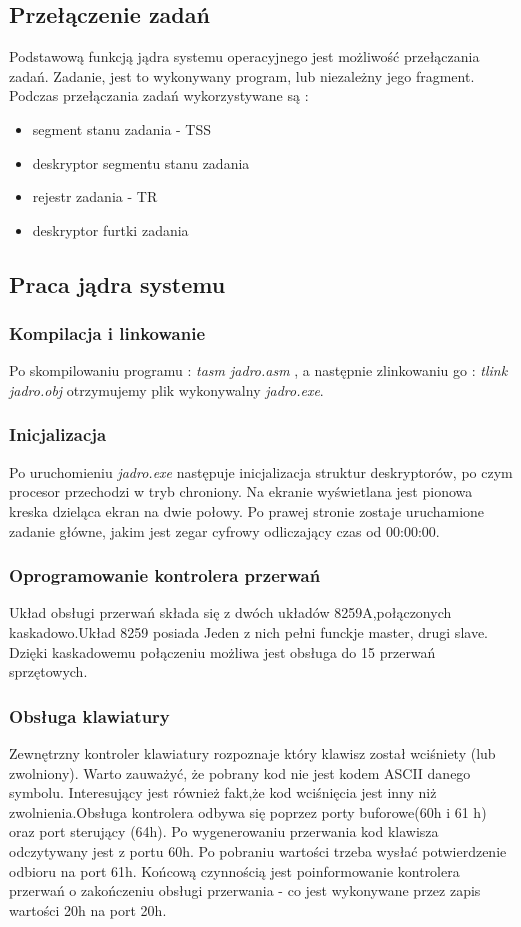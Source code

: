 \documentclass[a4paper,12pt]{article}
\begin{document}
	\subsection{Przełączenie zadań}
			Podstawową funkcją jądra systemu operacyjnego jest możliwość przełączania zadań. Zadanie, jest to wykonywany program, lub niezależny jego fragment. Podczas przełączania zadań wykorzystywane są :
		\begin{itemize}
			\item{segment stanu zadania - TSS}
			\item{deskryptor segmentu stanu zadania}
			\item{rejestr zadania - TR}
			\item{deskryptor furtki zadania}
		\end{itemize}
	\subsection{Praca jądra systemu}
		\subsubsection{Kompilacja i linkowanie}
			Po skompilowaniu programu : \textit{tasm jadro.asm} , a następnie zlinkowaniu go :  \textit{tlink jadro.obj} otrzymujemy plik wykonywalny \textit{jadro.exe}. 
		\subsubsection{Inicjalizacja} 	
			Po  uruchomieniu \textit{jadro.exe} następuje inicjalizacja struktur deskryptorów, po czym procesor przechodzi w tryb chroniony. Na ekranie wyświetlana jest pionowa kreska dzieląca ekran na dwie połowy. Po prawej stronie zostaje uruchamione zadanie główne, jakim jest zegar cyfrowy odliczający czas od 00:00:00.
		\subsubsection{Oprogramowanie kontrolera przerwań}
			Układ obsługi przerwań składa się z dwóch układów 8259A,połączonych kaskadowo.Układ 8259 posiada Jeden z nich pełni funckje master, drugi slave. Dzięki kaskadowemu połączeniu możliwa jest obsługa do 15 przerwań sprzętowych.  
		
		\subsubsection{Obsługa klawiatury}		
			Zewnętrzny kontroler klawiatury rozpoznaje który klawisz został wciśniety (lub zwolniony). Warto zauważyć, że pobrany kod nie jest kodem ASCII danego symbolu. Interesujący jest również fakt,że kod wciśnięcia jest inny niż zwolnienia.Obsługa kontrolera odbywa się poprzez porty buforowe(60h i 61 h) oraz port sterujący (64h). Po wygenerowaniu przerwania kod klawisza odczytywany jest z portu 60h. Po pobraniu wartości trzeba wysłać potwierdzenie odbioru na port 61h. Końcową czynnością jest poinformowanie kontrolera przerwań o zakończeniu obsługi przerwania - co jest wykonywane przez zapis wartości 20h na port 20h.
\end{document}
